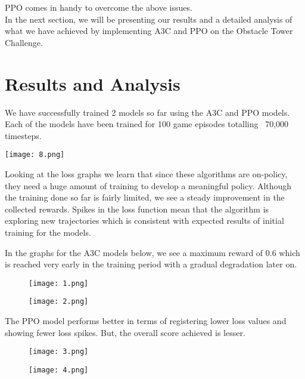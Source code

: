 \documentclass[conference]{IEEEtran}
\begin{document}
PPO comes in handy to overcome the above issues.\\

In the next section, we will be presenting our results and a detailed analysis of what we have achieved by implementing A3C and PPO on the Obstacle Tower Challenge.

\section{Results and Analysis}

We have successfully trained 2 models so far using the A3C and PPO models. Each of the models have been trained for 100 game episodes totalling ~70,000 timesteps.

\begin{figure*}
  \texttt{[image: 8.png]}
\end{figure*}

Looking at the loss graphs we learn that since these algorithms are on-policy, they need a huge amount of training to develop a meaningful policy. Although the training done so far is fairly limited, we see a steady improvement in the collected rewards. Spikes in the loss function mean that the algorithm is exploring new trajectories which is consistent with expected results of initial training for the models. 

In the graphs for the A3C models below, we see a maximum reward of 0.6 which is reached very early in the training period with a gradual degradation later on. 

\begin{figure}[htp]
    \centering
    \texttt{[image: 1.png]}
\end{figure}

\begin{figure}[htp]
    \centering
    \texttt{[image: 2.png]}
\end{figure}

The PPO model performs better in terms of registering lower loss values and showing fewer loss spikes. But, the overall score achieved is lesser.

\begin{figure}[htp]
    \centering
    \texttt{[image: 3.png]}
\end{figure}

\begin{figure}[htp]
    \centering
    \texttt{[image: 4.png]}
\end{figure}
\end{document}
